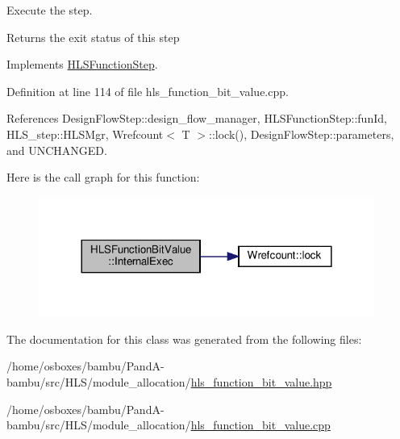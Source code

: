 Execute the step. 

\begin{DoxyReturn}{Returns}
the exit status of this step 
\end{DoxyReturn}


Implements \hyperlink{classHLSFunctionStep_a8db4c00d080655984d98143206fc9fa8}{H\+L\+S\+Function\+Step}.



Definition at line 114 of file hls\+\_\+function\+\_\+bit\+\_\+value.\+cpp.



References Design\+Flow\+Step\+::design\+\_\+flow\+\_\+manager, H\+L\+S\+Function\+Step\+::fun\+Id, H\+L\+S\+\_\+step\+::\+H\+L\+S\+Mgr, Wrefcount$<$ T $>$\+::lock(), Design\+Flow\+Step\+::parameters, and U\+N\+C\+H\+A\+N\+G\+ED.

Here is the call graph for this function\+:
\nopagebreak
\begin{figure}[H]
\begin{center}
\leavevmode
\includegraphics[width=312pt]{d5/d41/classHLSFunctionBitValue_aecc51d6904e74796099fac392b818e7b_cgraph}
\end{center}
\end{figure}


The documentation for this class was generated from the following files\+:\begin{DoxyCompactItemize}
\item 
/home/osboxes/bambu/\+Pand\+A-\/bambu/src/\+H\+L\+S/module\+\_\+allocation/\hyperlink{hls__function__bit__value_8hpp}{hls\+\_\+function\+\_\+bit\+\_\+value.\+hpp}\item 
/home/osboxes/bambu/\+Pand\+A-\/bambu/src/\+H\+L\+S/module\+\_\+allocation/\hyperlink{hls__function__bit__value_8cpp}{hls\+\_\+function\+\_\+bit\+\_\+value.\+cpp}\end{DoxyCompactItemize}
